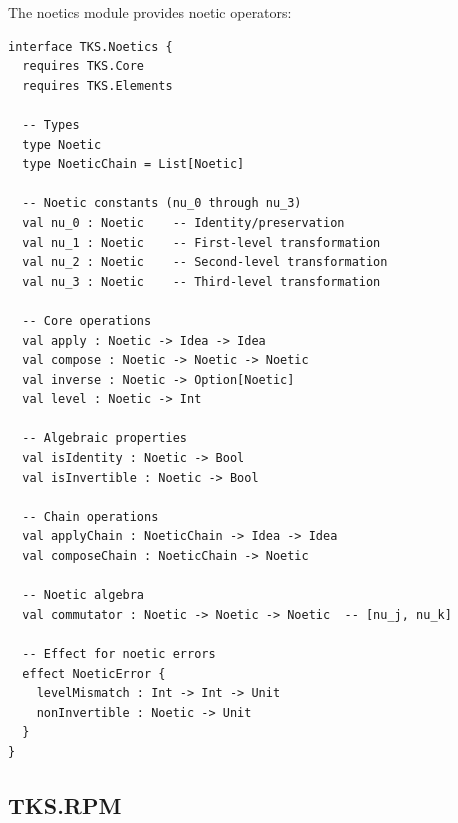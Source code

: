 \begin{definition}
\label{def:tks-noetics}
The noetics module provides noetic operators:
\begin{verbatim}
interface TKS.Noetics {
  requires TKS.Core
  requires TKS.Elements

  -- Types
  type Noetic
  type NoeticChain = List[Noetic]

  -- Noetic constants (nu_0 through nu_3)
  val nu_0 : Noetic    -- Identity/preservation
  val nu_1 : Noetic    -- First-level transformation
  val nu_2 : Noetic    -- Second-level transformation
  val nu_3 : Noetic    -- Third-level transformation

  -- Core operations
  val apply : Noetic -> Idea -> Idea
  val compose : Noetic -> Noetic -> Noetic
  val inverse : Noetic -> Option[Noetic]
  val level : Noetic -> Int

  -- Algebraic properties
  val isIdentity : Noetic -> Bool
  val isInvertible : Noetic -> Bool

  -- Chain operations
  val applyChain : NoeticChain -> Idea -> Idea
  val composeChain : NoeticChain -> Noetic

  -- Noetic algebra
  val commutator : Noetic -> Noetic -> Noetic  -- [nu_j, nu_k]

  -- Effect for noetic errors
  effect NoeticError {
    levelMismatch : Int -> Int -> Unit
    nonInvertible : Noetic -> Unit
  }
}
\end{verbatim}
\end{definition}

\subsection{TKS.RPM}
\label{subsec:tks-rpm}

